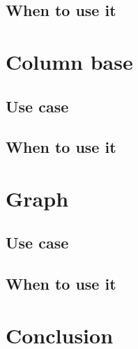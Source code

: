 \documentclass{CRPITStyle}
\begin{document}
\subsection{When to use it}


\section{Column base}

\subsection{Use case}

\subsection{When to use it}


\section{Graph}

\subsection{Use case}

\subsection{When to use it}

\section{Conclusion}




\end{document}
